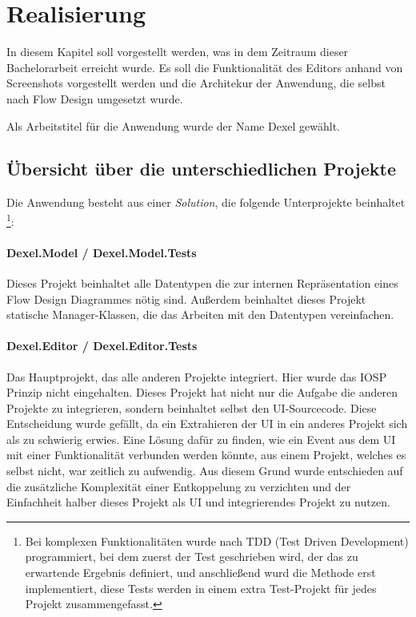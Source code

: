 
\chapter{Realisierung }

In diesem Kapitel soll vorgestellt werden, was in dem Zeitraum dieser
Bachelorarbeit erreicht wurde. Es soll die Funktionalität des Editors
anhand von Screenshots vorgestellt werden und die Architekur der Anwendung, die selbst nach  Flow Design umgesetzt wurde. 

Als Arbeitstitel für die Anwendung wurde der Name Dexel gewählt.

\section{Übersicht über die unterschiedlichen Projekte}

Die Anwendung besteht aus einer \textit{Solution}, die folgende Unterprojekte beinhaltet \footnote{Bei komplexen Funktionalitäten wurde nach TDD (Test Driven Development)
programmiert, bei dem zuerst der Test geschrieben wird, der das zu erwartende
Ergebnis definiert, und anschließend wurd die Methode erst implementiert, diese
Tests werden in einem extra Test-Projekt für jedes Projekt zusammengefasst.}:

\subsubsection{Dexel.Model / Dexel.Model.Tests}

Dieses Projekt beinhaltet alle Datentypen die zur internen Repräsentation
eines Flow Design Diagrammes nötig sind. Außerdem beinhaltet dieses Projekt
statische Manager-Klassen, die das Arbeiten mit den Datentypen vereinfachen.

\subsubsection{Dexel.Editor / Dexel.Editor.Tests}

Das Hauptprojekt, das alle anderen Projekte integriert. Hier wurde das IOSP
Prinzip nicht eingehalten. Dieses Projekt hat nicht nur die Aufgabe die
anderen Projekte zu integrieren, sondern beinhaltet selbst den
UI-Sourcecode. Diese Entscheidung wurde gefällt, da ein Extrahieren der UI
in ein anderes Projekt sich als zu schwierig erwies. Eine Lösung dafür zu
finden, wie ein Event aus dem UI mit einer Funktionalität verbunden werden
könnte, aus einem Projekt, welches es selbst nicht, war zeitlich zu
aufwendig. Aus diesem Grund wurde entschieden auf die zusätzliche
Komplexität einer Entkoppelung zu verzichten und der Einfachheit halber
dieses Projekt als UI und integrierendes Projekt zu nutzen.

